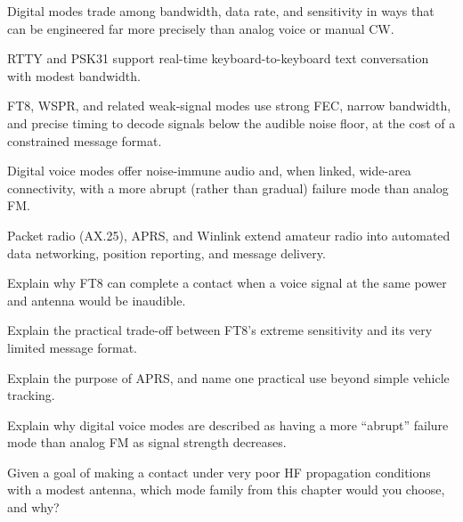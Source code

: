 \begin{quickreview}
\item Digital modes trade among bandwidth, data rate, and sensitivity
in ways that can be engineered far more precisely than analog voice or
manual CW.
\item RTTY and PSK31 support real-time keyboard-to-keyboard text
conversation with modest bandwidth.
\item FT8, WSPR, and related weak-signal modes use strong FEC, narrow
bandwidth, and precise timing to decode signals below the audible noise
floor, at the cost of a constrained message format.
\item Digital voice modes offer noise-immune audio and, when linked,
wide-area connectivity, with a more abrupt (rather than gradual)
failure mode than analog FM.
\item Packet radio (AX.25), APRS, and Winlink extend amateur radio into
automated data networking, position reporting, and message delivery.
\end{quickreview}

\begin{practiceproblems}
\item Explain why FT8 can complete a contact when a voice signal at the
same power and antenna would be inaudible.
\item Explain the practical trade-off between FT8's extreme sensitivity
and its very limited message format.
\item Explain the purpose of APRS, and name one practical use beyond
simple vehicle tracking.
\item Explain why digital voice modes are described as having a more
``abrupt'' failure mode than analog FM as signal strength decreases.
\item Given a goal of making a contact under very poor HF propagation
conditions with a modest antenna, which mode family from this chapter
would you choose, and why?
\end{practiceproblems}
